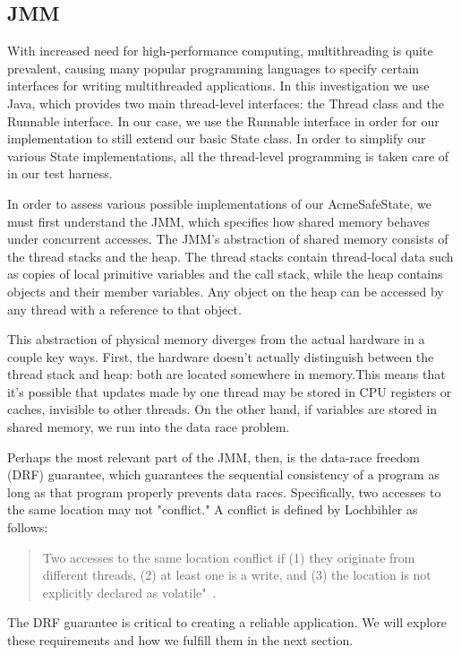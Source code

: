 \subsection{JMM}

With increased need for high-performance computing, multithreading is quite prevalent, 
causing many popular programming languages to specify certain interfaces for 
writing multithreaded applications. In this investigation we use Java, which provides
two main thread-level interfaces: the Thread class and the Runnable interface. In our 
case, we use the Runnable interface in order for our implementation to still extend 
our basic State class. In order to simplify our various State implementations,
all the thread-level programming is taken care of in our test harness.  

In order to assess various possible implementations of our AcmeSafeState, 
we must first understand the JMM, which specifies how shared memory behaves
under concurrent accesses. The JMM's abstraction of shared memory consists of 
the thread stacks and the heap. The thread stacks contain thread-local data such as 
copies of local primitive variables and the call stack, while the heap contains objects and their
member variables. Any object on the heap can be accessed by any thread with a reference to 
that object. 

This abstraction of physical memory diverges from the actual hardware in a couple key ways. First, 
the hardware doesn't actually distinguish between the thread stack and heap: both are located somewhere
in memory.This means that it's possible that updates made by one thread may be stored in CPU registers or caches, invisible to other 
threads. On the other hand, if variables are stored in shared memory, we run into the data race problem.

Perhaps the most relevant part of the JMM, then, is the data-race freedom (DRF) guarantee, which guarantees
the sequential consistency of a program as long as that program properly prevents data races.
Specifically, two accesses to the same location may not "conflict." A conflict is defined by Lochbihler as follows: 

\begin{quote}
Two accesses to the same location conflict if
(1) they originate from different threads,
(2) at least one is a write, and
(3) the location is not explicitly declared as volatile"~\cite{loch}.
\end{quote}

The DRF guarantee is 
critical to creating a reliable application. We will explore these requirements and how we fulfill them 
in the next section.

